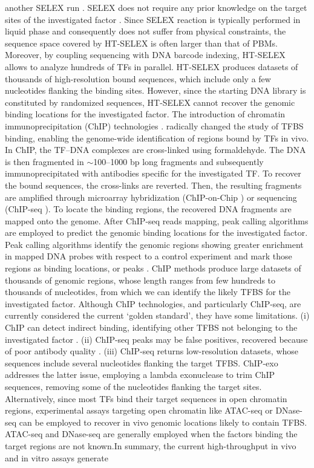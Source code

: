 \documentclass[a4paper, titlepage, openright]{book}
\begin{document}
another SELEX run \citep{jolma2011methods,jolma2010multiplexed}. SELEX does not require any prior knowledge on the target sites of the investigated factor \citep{jolma2013dna}. Since SELEX reaction is typically performed in liquid phase and consequently does not suffer from physical constraints, the sequence space covered by HT-SELEX is often larger than that of PBMs. Moreover, by coupling sequencing with DNA barcode indexing, HT-SELEX allows to analyze hundreds of TFs in parallel. HT-SELEX produces datasets of thousands of high-resolution bound sequences, which include only a few nucleotides flanking the binding sites. However, since the starting DNA library is constituted by randomized sequences, HT-SELEX cannot recover the genomic binding locations for the investigated factor. The introduction of chromatin immunoprecipitation (ChIP) technologies \citep{collas2008chop}. radically changed the study of TFBS binding, enabling the genome-wide identification of regions bound by TFs in vivo. In ChIP, the TF–DNA complexes are cross-linked using formaldehyde. The DNA is then fragmented in $\sim$100–1000 bp long fragments and subsequently immunoprecipitated with antibodies specific for the investigated TF. To recover the bound sequences, the cross-links are reverted. Then, the resulting fragments are amplified through microarray hybridization (ChIP-on-Chip \citep{collas2008chop,pillai2015chip}) or sequencing (ChIP-seq \citep{johnson2007genome,mardis2007chip}). To locate the binding regions, the recovered DNA fragments are mapped onto the genome. After ChIP-seq reads mapping, peak calling algorithms \citep{thomas2017features,guo2012high,zhang2008model} are employed to predict the genomic binding locations for the investigated factor. Peak calling algorithms identify the genomic regions showing greater enrichment in mapped DNA probes with respect to a control experiment and mark those regions as binding locations, or peaks  \citep{pepke2009computation}. ChIP methods produce large datasets of thousands of genomic regions, whose length ranges from few hundreds to thousands of nucleotides, from which we can identify the likely TFBS for the investigated factor. Although ChIP technologies, and particularly ChIP-seq, are currently considered the current ‘golden standard’, they have some limitations. (i) ChIP can detect indirect binding, identifying other TFBS not belonging to the investigated factor \citep{worsley2014non}. (ii) ChIP-seq peaks may be false positives, recovered because of poor antibody quality \citep{pickrell2011false}. (iii) ChIP-seq returns low-resolution datasets, whose sequences include several nucleotides flanking the target TFBS. ChIP-exo  \citep{rhee2011comprehensive} addresses the latter issue, employing a lambda exonuclease to trim ChIP sequences, removing some of the nucleotides flanking the target sites. Alternatively, since most TFs bind their target sequences in open chromatin regions, experimental assays targeting open chromatin like ATAC-seq or DNase-seq \citep{buenrostro2013transposition,john2011chromatin} can be employed to recover in vivo genomic locations likely to contain TFBS. ATAC-seq and DNase-seq are generally employed when the factors binding the target regions are not known.In summary, the current high-throughput in vivo and in vitro assays generate 
\end{document}
